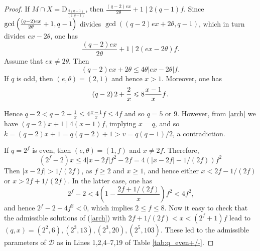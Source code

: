 \documentclass[a4paper,twopage,reqno,12pt]{amsart}
\theoremstyle{definition}
\numberwithin{equation}{section}
\newcommand{\D}{\mathrm{D}}
\renewcommand{\leq}{\leqslant}
\renewcommand{\geq}{\geqslant}
\begin{document}
\begin{proof} If $M\cap X=\D_{\frac{2(q-1)}{(2,q-1)}} $, then $\frac{\left( q-2\right) ex}{2\theta }%
+1\mid 2(q-1)f$. Since $\gcd \left( \frac{\left( q-2\right) ex}{%
2\theta }+1,q-1\right) $ divides $\gcd \left( \left( q-2\right) ex+2\theta
,q-1\right) $, which in turn divides $ex-2\theta $, one has 
\begin{equation}\label{arch}
\frac{\left( q-2\right) ex}{2\theta }+1\mid 2(ex-2\theta )f\text{.} 
\end{equation} Assume that $ex\neq 2\theta $. Then 
\[
\left( q-2\right) ex+2\theta \leq 4\theta \left\vert ex-2\theta \right\vert f\text{.} 
\]%
If $q$ is odd, then $(e,\theta )=(2,1)$ and hence $x > 1$. Moreover, one has 
$$\left( q-2\right) 2+\frac{2}{x}\leq 8\frac{%
x-1 }{x}f\text{.}$$

Hence $q-2<q-2+\frac{1}{x}\leq 4%
\frac{x-1}{x}f\leq 4f$ and so $q=5$ or $9$. 
However, from \ref{arch} we have $(q-2)x+1\mid 4(x-1)f$, implying $x=q$, and so $k=(q-2)x+1=q(q-2)+1>v=q(q-1)/2$, a contradiction.

If $q=2^{f}$ is even, then $(e,\theta )=\left(1,f
\right) $ and $x \neq 2f$. Therefore,  
\begin{equation*}
\left( 2^{f}-2\right)x\leq 4\left\vert x-2f\right\vert f^{2} -2f=4\left( \left\vert x-2f\right\vert -1/(2f)\right) f^{2}
\end{equation*}%
Then $\left\vert x-2f\right\vert >1/(2f)$, as $f\geq 2 $ and $x \geq 1$, and
hence either $x<2f-1/(2f)$ or $x>2f+1/(2f)$.
In the latter case, one has 
\begin{equation*}
2^{f}-2<4\left( 1-\frac{2f+1/(2f)}{x}\right) f^{2}<4f^{2}\text{,} 
\end{equation*}
and hence $2^{f}-2-4f^{2}<0$, which implies $2\le f\le 8$. Now it easy to check that the admissible solutions of (\ref{arch}) with $2f+1/(2f)<x<\left(2^{f}+1\right)f$ lead to $(q,x)=(2^2,6),(2^3,13),(2^3,20),(2^5,103)$. These led to the admissible parameters of $\mathcal{D}$ as in Lines 1,2,4--7,19 of Table \ref{tab:q_even+/-}.


\end{proof}
\end{document}
